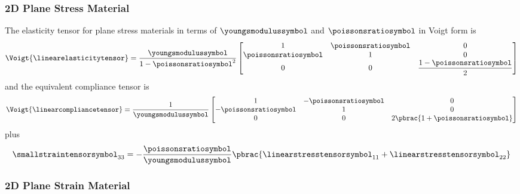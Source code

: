 \subsubsection{2D Plane Stress Material}

The elasticity tensor for \twodal plane stress materials in terms of $\youngsmodulussymbol$ and $\poissonsratiosymbol$ in Voigt form is
\begin{equation}
  \Voigt{\linearelasticitytensor}=\dfrac{\youngsmodulussymbol}{1-\poissonsratiosymbol^{2}}\begin{bmatrix}
  1 & \poissonsratiosymbol & 0 \\
  \poissonsratiosymbol & 1 & 0 \\
  0 & 0 & \dfrac{1-\poissonsratiosymbol}{2}
  \end{bmatrix}
  \label{eqn:LinearElasticityPlaneStressElasticityTensorVoigtEnu}
\end{equation}
and the equivalent compliance tensor is
\begin{equation}
  \Voigt{\linearcompliancetensor}=\dfrac{1}{\youngsmodulussymbol}\begin{bmatrix}
  1 & -\poissonsratiosymbol & 0 \\
  -\poissonsratiosymbol & 1 & 0 \\
  0 & 0 & 2\pbrac{1+\poissonsratiosymbol}
  \end{bmatrix}
  \label{eqn:LinearElasticityPlaneStressComplianceTensorVoigtEnu}
\end{equation}
plus
\begin{equation}
  \smallstraintensorsymbol_{33}=-\dfrac{\poissonsratiosymbol}{\youngsmodulussymbol}\pbrac{\linearstresstensorsymbol_{11}+\linearstresstensorsymbol_{22}}
\end{equation}

\subsubsection{2D Plane Strain Material}

